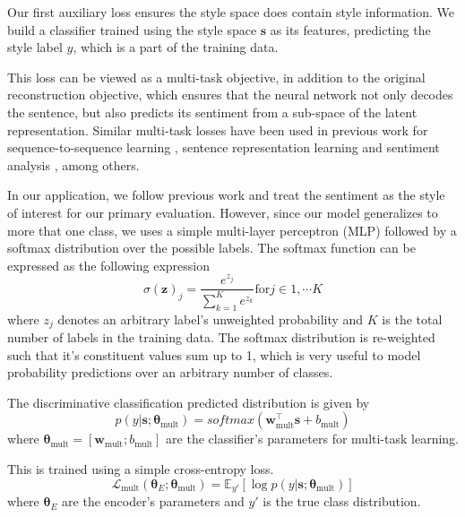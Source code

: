 Our first auxiliary loss ensures the style space does contain style information. We build a classifier trained using the style space $\bm s$ as its features, predicting the style label $y$, which is a part of the training data.

This loss can be viewed as a multi-task objective, in addition to the original reconstruction objective, which ensures that the neural network not only decodes the sentence, but also predicts its sentiment from a sub-space of the latent representation. Similar multi-task losses have been used in previous work for sequence-to-sequence learning \citep{luong2015multi}, sentence representation learning \citep{jernite2017discourse} and sentiment analysis \citep{balikas2017multitask}, among others.

In our application, we follow previous work \citep{hu2017toward,shen2017style,fu2017style} and treat the sentiment as the style of interest for our primary evaluation. However, since our model generalizes to more that one class, we uses a simple multi-layer perceptron (MLP) followed by a softmax distribution over the possible labels. The softmax function can be expressed as the following expression
\begin{equation*}
	\sigma(\mathbf{z})_j = \frac{e^{z_j}}{\sum_{k=1}^K e^{z_k}} \text{for} j \in {1, \cdots K}
\end{equation*}
where $z_j$ denotes an arbitrary label's unweighted probability and $K$ is the total number of labels in the training data. The softmax distribution is re-weighted such that it's constituent values sum up to 1, which is very useful to model probability predictions over an arbitrary number of classes.

The discriminative classification predicted distribution is given by
\begin{equation} \label{eqn:class-pred}
	p(y | \bm s; \bm\theta_\text{mult}) = softmax(\bm w_\text{mult}^\top \bm s + b_\text{mult})
\end{equation}
where $\bm\theta_\text{mult}=[\bm w_\text{mult}; b_\text{mult}]$ are the classifier's parameters for multi-task learning.

This is trained using a simple cross-entropy loss.
\begin{equation} \label{eqn:multi-task-loss}
	\mathcal{L}_\text{mult}(\bm\theta_{E};\bm\theta_\text{mult}) =
	\mathbb{E}_{y'} [\log p(y | \bm s; \bm\theta_\text{mult})]
\end{equation}
where $\bm\theta_E$ are the encoder's parameters and $y'$ is the true class distribution.


